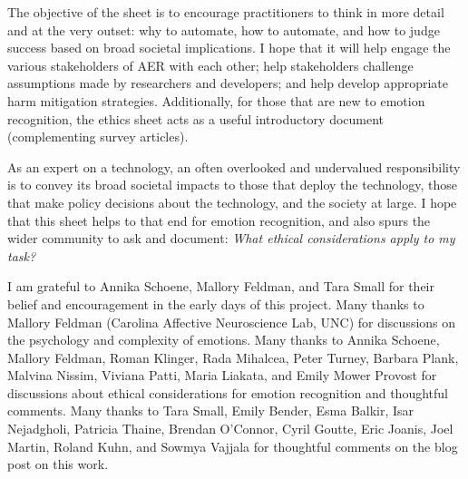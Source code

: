 \documentclass{clv3}
\begin{document}
The objective of the sheet is to encourage practitioners to think in more detail and at the very outset: why to automate, how to automate, and how to judge success based on broad societal implications. 
I hope that it will help engage the various stakeholders of AER with each other; help stakeholders challenge assumptions made by researchers and developers; and help develop appropriate harm mitigation strategies.
Additionally, for those that are new to emotion recognition, the ethics sheet acts as a useful introductory document  (complementing survey articles).


As an expert on a technology, an often overlooked and undervalued responsibility is to convey its broad societal impacts 
to those that deploy the technology, those that make policy decisions about the technology, and the society at large. 
I hope that this sheet helps to that end for emotion recognition, and also spurs the wider community to ask and document: \textit{What ethical considerations apply to my task?} 

 




\begin{acknowledgments}
 I am grateful to Annika Schoene, Mallory Feldman, and Tara Small for their belief and encouragement in the early days of this project.
 Many thanks to Mallory Feldman (Carolina Affective Neuroscience Lab, UNC) for discussions on the psychology and complexity of emotions. 
  Many thanks to Annika Schoene, Mallory Feldman, Roman Klinger, Rada Mihalcea, Peter Turney, Barbara Plank, Malvina Nissim, Viviana Patti, Maria Liakata, and Emily Mower Provost for discussions about ethical considerations for emotion recognition and thoughtful comments. Many thanks to Tara Small, Emily Bender, Esma Balkir, Isar Nejadgholi, Patricia Thaine, Brendan O’Connor, Cyril Goutte, Eric Joanis, Joel Martin, Roland Kuhn, and Sowmya Vajjala for thoughtful comments on the blog post on this work.
 \end{acknowledgments}
\end{document}
